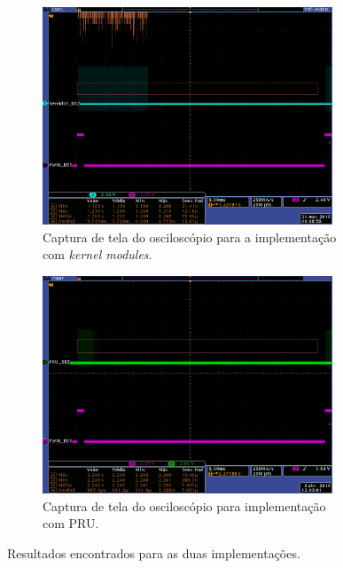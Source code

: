 \begin{figure}[h]

\centering
	\begin{subfigure}[t]{0.5\textwidth}
		\centering
		\includegraphics[width=0.95\textwidth]{image/tek_com_threads}
		\caption {\centering Captura de tela do osciloscópio para a implementação com
		\textit{kernel modules}.}
		\label{fig:osciloscopio_thread}
	\end{subfigure}%
	\begin{subfigure}[t]{0.5\textwidth}
		\centering
		\includegraphics[width=0.95\textwidth]{image/tek_pru}
		\caption {\centering Captura de tela do osciloscópio para implementação com
		PRU.}
		\label{fig:pru_osciloscopio_thread}
	\end{subfigure}%
	
	\caption {Resultados encontrados para as duas implementações.}
\end{figure}

